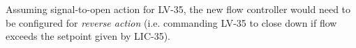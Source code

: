 \vskip 10pt

Assuming signal-to-open action for LV-35, the new flow controller would need to be configured for {\it reverse action} (i.e. commanding LV-35 to close down if flow exceeds the setpoint given by LIC-35).











